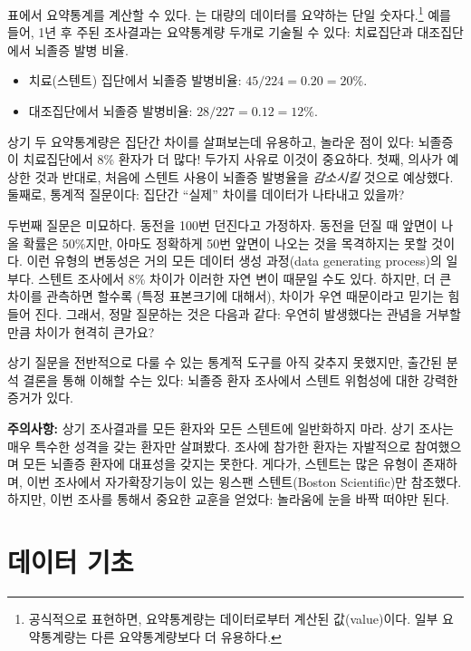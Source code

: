 표에서 요약통계를 계산할 수 있다.
는 대량의 데이터를 요약하는 단일 숫자다.\footnote{
공식적으로 표현하면, 요약통계량는 데이터로부터 계산된 값(value)이다. 일부 요약통계량는 다른 요약통계량보다 더 유용하다.} 예를 들어, 1년 후 주된 조사결과는 요약통계량 두개로 기술될 수 있다: 치료집단과 대조집단에서 뇌졸증 발병 비율.

\begin{itemize}
\setlength{\itemsep}{0mm}
\item[] 치료(스텐트) 집단에서 뇌졸증 발병비율: $45/224 = 0.20 = 20\%$.
\item[] 대조집단에서 뇌졸증 발병비율: $28/227 = 0.12 = 12\%$.
\end{itemize}

상기 두 요약통계량은 집단간 차이를 살펴보는데 유용하고, 놀라운 점이 있다:
뇌졸증이 치료집단에서 8\% 환자가 더 많다!
두가지 사유로 이것이 중요하다. 첫째, 의사가 예상한 것과 반대로, 처음에 스텐트 사용이 뇌졸증 발병율을 \emph{감소시킬} 것으로 예상했다.
둘째로, 통계적 질문이다: 집단간 ``실제'' 차이를 데이터가 나타내고 있을까?

두번째 질문은 미묘하다. 동전을 100번 던진다고 가정하자.
동전을 던질 때 앞면이 나올 확률은 50\%지만, 아마도 정확하게 50번 앞면이 나오는 것을 목격하지는 못할 것이다. 이런 유형의 변동성은 거의 모든 데이터 생성 과정(data generating process)의 일부다. 스텐트 조사에서 8\% 차이가 이러한 자연 변이 때문일 수도 있다.
하지만, 더 큰 차이를 관측하면 할수록 (특정 표본크기에 대해서), 차이가 우연 때문이라고 믿기는 힘들어 진다. 그래서, 정말 질문하는 것은 다음과 같다: 우연히 발생했다는 관념을 거부할만큼 차이가 현격히 큰가요?

상기 질문을 전반적으로 다룰 수 있는 통계적 도구를 아직 갖추지 못했지만, 출간된 분석 결론을 통해 이해할 수는 있다: 뇌졸증 환자 조사에서 스텐트 위험성에 대한 강력한 증거가 있다.

\textbf{주의사항:} 상기 조사결과를 모든 환자와 모든 스텐트에 일반화하지 마라.
상기 조사는 매우 특수한 성격을 갖는 환자만 살펴봤다. 조사에 참가한 환자는 자발적으로 참여했으며 모든 뇌졸증 환자에 대표성을 갖지는 못한다. 게다가,
스텐트는 많은 유형이 존재하며, 이번 조사에서 자가확장기능이 있는 윙스팬 스텐트(Boston Scientific)만 참조했다. 하지만, 이번 조사를 통해서 중요한 교훈을 얻었다: 
놀라움에 눈을 바짝 떠야만 된다.


\section[Data basics]{데이터 기초 }
\label{dataBasics}

